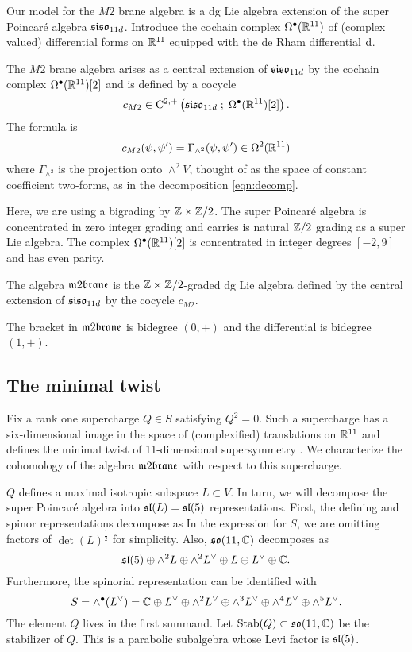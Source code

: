 Our model for the $M2$ brane algebra is a dg Lie algebra extension of the super Poincar\'e algebra $\mathfrak{siso}_{11d}$.
Introduce the cochain complex $\Omega^{\bullet}(\mathbb R^{11})$ of (complex valued) differential forms on $\mathbb R^{11}$ equipped with the de Rham differential ${\rm d}$.
 
The $M2$ brane algebra arises as a central extension of $\mathfrak{siso}_{11d}$ by the cochain complex $\Omega^\bullet(\mathbb R^{11})[2]$ and is defined by a cocycle
\[
    c_{M2} \in {\rm C}^{2,+} \left(\mathfrak{siso}_{11d} \; ; \; \Omega^\bullet (\mathbb R^{11})[2]\right) .
\]
The formula is
  \[c_{M2} (\psi, \psi') = \Gamma_{\wedge^2}(\psi, \psi') \in \Omega^2(\mathbb R^{11})\]
  where $\Gamma_{\wedge^2}$ is the projection onto $\wedge^2 V$, thought of as the space of constant coefficient two-forms, as in the decomposition \eqref{eqn:decomp}.
  
Here, we are using a bigrading by $\mathbb Z \times \mathbb Z/2$. 
The super Poincar\'e algebra is concentrated in zero integer grading and carries is natural $\mathbb Z/2$ grading as a super Lie algebra.
The complex $\Omega^{\bullet}(\mathbb R^{11})[2]$ is concentrated in integer degrees $[-2,9]$ and has even parity.

\begin{dfn}
The algebra $\m2$ is the $\mathbb Z \times \mathbb Z/2$-graded dg Lie algebra defined by the central extension of $\mathfrak{siso}_{11d}$ by the cocycle $c_{M2}$.  
\end{dfn}

The bracket in $\m2$ is bidegree $(0,+)$ and the differential is bidegree $(1,+)$.

\subsection{The minimal twist}
\label{sec:mintwist}

Fix a rank one supercharge $Q \in S$ satisfying $Q^2 = 0$.
Such a supercharge has a six-dimensional image in the space of (complexified) translations on $\mathbb R^{11}$ and defines the minimal twist of 11-dimensional supersymmetry \cite{SWspinor}. 
We characterize the cohomology of the algebra $\m2$ with respect to this supercharge. 

$Q$ defines a maximal isotropic subspace $L \subset V$. 
In turn, we will decompose the super Poincar\'e algebra into $\mathfrak{sl}(L) = \mathfrak{sl}(5)$ representations.
First, the defining and spinor representations decompose as
In the expression for $S$, we are omitting factors of $\det(L)^{\frac12}$ for simplicity. 
Also, $\mathfrak{so}(11, \mathbb C)$ decomposes as
\[
\mathfrak{sl}(5) \oplus \wedge^2 L \oplus \wedge^2 L^\vee \oplus L \oplus L^\vee \oplus \mathbb{C} .
\]
Furthermore, the spinorial representation can be identified with
\[
S = \wedge^\bullet (L^\vee) = \mathbb C \oplus L^\vee \oplus \wedge^2 L^\vee \oplus \wedge^3 L^\vee \oplus \wedge^4 L^\vee \oplus \wedge^5 L^\vee .
\]
The element $Q$ lives in the first summand.
Let ${\rm Stab}(Q) \subset \mathfrak{so}(11,\mathbb C)$ be the stabilizer of $Q$. 
This is a parabolic subalgebra whose Levi factor is $\mathfrak{sl}(5)$.

